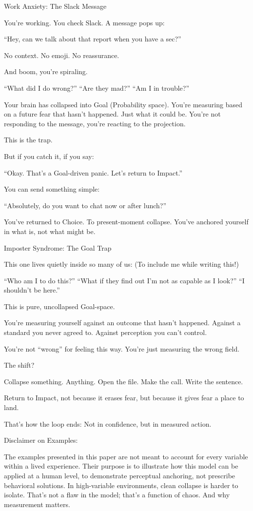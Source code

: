 \documentclass[11pt]{article}
\begin{document}
Work Anxiety: The Slack Message

You’re working. You check Slack. A message pops up:

“Hey, can we talk about that report when you have a sec?”

No context. No emoji. No reassurance.

And boom, you’re spiraling.

“What did I do wrong?”
“Are they mad?”
“Am I in trouble?”

Your brain has collapsed into Goal (Probability space).
You're measuring based on a future fear that hasn’t happened. Just what it could be. 
You’re not responding to the message, you’re reacting to the projection.

This is the trap.

But if you catch it, if you say:

“Okay. That’s a Goal-driven panic. Let’s return to Impact.”

You can send something simple:

“Absolutely, do you want to chat now or after lunch?”

You’ve returned to Choice. To present-moment collapse.
You’ve anchored yourself in what is, not what might be.

Imposter Syndrome: The Goal Trap

This one lives quietly inside so many of us: (To include me while writing this!)

“Who am I to do this?”
“What if they find out I’m not as capable as I look?”
“I shouldn’t be here.”

This is pure, uncollapsed Goal-space.

You’re measuring yourself against an outcome that hasn’t happened.
Against a standard you never agreed to.
Against perception you can’t control.

You’re not “wrong” for feeling this way.
You’re just measuring the wrong field.

The shift?

Collapse something. Anything.
Open the file. Make the call. Write the sentence.

Return to Impact, not because it erases fear, but because it gives fear a place to land.

That’s how the loop ends:
Not in confidence, but in measured action.

Disclaimer on Examples:

The examples presented in this paper are not meant to account for every variable within a lived experience. Their purpose is to illustrate how this model can be applied at a human level, to demonstrate perceptual anchoring, not prescribe behavioral solutions. In high-variable environments, clean collapse is harder to isolate. That’s not a flaw in the model; that’s a function of chaos. And why measurement matters.
\end{document}
